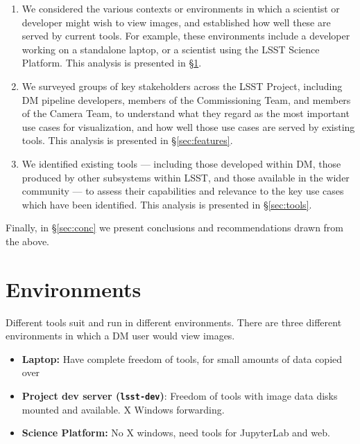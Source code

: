 \documentclass[DM,authoryear,toc]{lsstdoc}
\begin{document}
\begin{enumerate}

  \item{
    We considered the various contexts or environments in which a scientist or developer might wish to view images, and established how well these are served by current tools.
    For example, these environments include a developer working on a standalone laptop, or a scientist using the LSST Science Platform.
    This analysis is presented in \S\ref{sec:env}.
  }

  \item{
    We surveyed groups of key stakeholders across the LSST Project, including DM pipeline developers, members of the Commissioning Team, and members of the Camera Team, to understand what they regard as the most important use cases for visualization, and how well those use cases are served by existing tools.
    This analysis is presented in \S\ref{sec:features}.
  }

  \item{
    We identified existing tools --- including those developed within DM, those produced by other subsystems within LSST, and those available in the wider community --- to assess their capabilities and relevance to the key use cases which have been identified.
    This analysis is presented in \S\ref{sec:tools}.
  }

\end{enumerate}

Finally, in \S\ref{sec:conc} we present conclusions and recommendations drawn from the above.

\section{Environments}
\label{sec:env}

Different tools suit and run in different environments.
There are three different environments in which a DM user would view images.

\begin{itemize}
\item{\textbf{Laptop:} Have complete freedom of tools, for small amounts of data copied over}
\item{\textbf{Project dev server (\texttt{lsst-dev})}: Freedom of tools with image data disks mounted and available. X Windows forwarding.}
\item{\textbf{Science Platform:}  No X windows, need tools for JupyterLab and web.}
\end{itemize}
\end{document}
